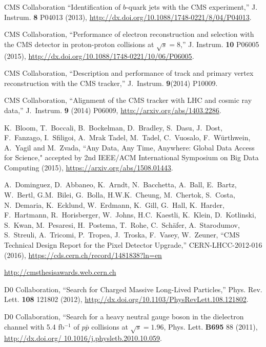 \begin{thebibliography}{99}
 CMS Collaboration ``Identification of $b$-quark jets with the CMS experiment,'' J. Instrum. {\bf 8} P04013 (2013), \url{http://dx.doi.org/10.1088/1748-0221/8/04/P04013}.
 
CMS Collaboration, ``Performance of electron reconstruction and selection with the CMS detector in proton-proton collisions at $\sqrt{s}=$8\TeV,'' J. Instrum. {\bf 10} P06005 (2015), \url{http://dx.doi.org/10.1088/1748-0221/10/06/P06005}.
 
CMS Collaboration, ``Description and performance of track and primary vertex reconstruction with the CMS tracker,'' J.~Instrum. \textbf{9}(2014) P10009.

CMS Collaboration, ``Alignment of the CMS tracker with LHC and cosmic ray data,'' J.~Instrum. \textbf{9} (2014) P06009, \url{http://arxiv.org/abs/1403.2286}.

 K.~Bloom, T.~Boccali, B.~Bockelman, D.~Bradley, S.~Dasu, J.~Dost, F.~Fanzago, I.~Sfiligoi, A.~Mrak Tadel, M.~Tadel, C.~Vuosalo, F.~W\"{u}rthwein, A.~Yagil and M.~Zvada, ``Any Data, Any Time, Anywhere: Global Data Access for Science," accepted by 2nd IEEE/ACM International Symposium on Big Data Computing (2015), \url{https://arxiv.org/abs/1508.01443}.

A.~Dominguez, D.~Abbaneo, K.~Arndt, N.~Bacchetta, A.~Ball, E.~Bartz, W.~Bertl, G.M.~Bilei, G.~Bolla, H.W.K.~Cheung, M.~Chertok, S.~Costa, N.~Demaria, K.~Ecklund, W.~Erdmann, K.~Gill, G.~Hall, K.~Harder, F.~Hartmann, R.~Horisberger, W.~Johns, H.C.~Kaestli, K.~Klein, D.~Kotlinski, S.~Kwan, M.~Pesaresi, H.~Postema, T.~Rohe, C.~Sch\"{a}fer, A.~Starodumov, S.~Streuli, A.~Tricomi, P.~Tropea, J.~Troska, F.~Vasey, W.~Zeuner, ``CMS Technical Design Report for the Pixel Detector Upgrade,'' CERN-LHCC-2012-016 (2016), \url{https://cds.cern.ch/record/1481838?ln=en}

 \url{http://cmsthesisawards.web.cern.ch}


 D0 Collaboration, ``Search for Charged Massive Long-Lived Particles,” Phys. Rev. Lett. {\bf 108} 121802 (2012), \url{http://dx.doi.org/10.1103/PhysRevLett.108.121802}.

 D0 Collaboration, ``Search for a heavy neutral gauge boson in the dielectron channel with 5.4 fb$^{−1}$ of $p\bar{p}$ collisions at $\sqrt{s}=1.96$\TeV, Phys. Lett. {\bf B695} 88 (2011), \url{http://dx.doi.org/ 10.1016/j.physletb.2010.10.059}.


\end{thebibliography}
